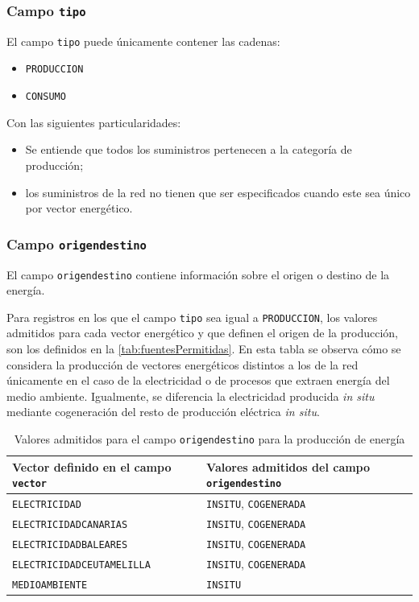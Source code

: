 \documentclass[10pt,notitlepage,oneside,a4paper]{article}
\begin{document}
\subsubsection{Campo \texttt{tipo}}

El campo \texttt{tipo} puede únicamente contener las cadenas:

\begin{itemize}
\item \texttt{PRODUCCION}
\item \texttt{CONSUMO}
\end{itemize}

Con las siguientes particularidades:

\begin{itemize}
\item Se entiende que todos los suministros pertenecen a la categoría de producción;
\item los suministros de la red no tienen que ser especificados cuando este sea único por vector energético.
\end{itemize}

\subsubsection{Campo \texttt{origendestino}}

El campo \texttt{origendestino} contiene información sobre el origen o destino de la energía.

Para registros en los que el campo \texttt{tipo} sea igual a \texttt{PRODUCCION}, los valores admitidos para cada vector energético y que definen el origen de la producción, son los definidos en la \autoref{tab:fuentesPermitidas}. En esta tabla se observa cómo se considera la producción de vectores energéticos distintos a los de la red únicamente en el caso de la electricidad o de procesos que extraen energía del medio ambiente. Igualmente, se diferencia la electricidad producida \textit{in situ} mediante cogeneración del resto de producción eléctrica \textit{in situ}.

\begin{table}[H]
\centering
\small
\caption{Valores admitidos para el campo \texttt{origendestino} para la producción de energía}\label{tab:fuentesPermitidas}
\begin{tabular}{ll}
    \toprule
    \textbf{Vector definido en el campo \texttt{vector}} & \textbf{Valores admitidos del campo \texttt{origendestino}}\\
    \midrule
    \texttt{ELECTRICIDAD}             & \texttt{INSITU}, \texttt{COGENERADA}\\
    \texttt{ELECTRICIDADCANARIAS}     & \texttt{INSITU}, \texttt{COGENERADA}\\
    \texttt{ELECTRICIDADBALEARES}     & \texttt{INSITU}, \texttt{COGENERADA}\\
    \texttt{ELECTRICIDADCEUTAMELILLA} & \texttt{INSITU}, \texttt{COGENERADA}\\
    \texttt{MEDIOAMBIENTE}            & \texttt{INSITU}\\
    \bottomrule
\end{tabular}
\end{table}
\end{document}

